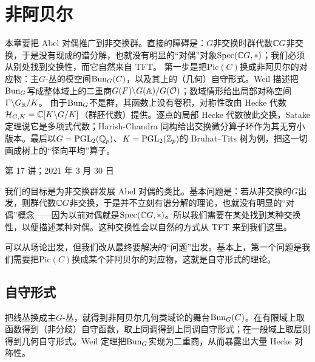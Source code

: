 \chapter{非阿贝尔}\label{ch:09}

\begin{keytakeaways}
本章要把 Abel 对偶推广到非交换群。直接的障碍是：$G$非交换时群代数$\mathbb{C} G$非交换，于是没有现成的谱分解，也就没有明显的“对偶”对象$\mathrm{Spec}(\mathbb{C} G,*)$；我们必须从别处找到交换性，而它自然来自 TFT。
第一步是把$\mathrm{Pic}(C)$换成非阿贝尔的对应物：主$G$-丛的模空间$\mathrm{Bun}_G(C)$，以及其上的（几何）自守形式。Weil 描述把$\mathrm{Bun}_G$写成整体域上的二重商$G(F)\backslash G(\mathbb{A})/G(\mathcal{O})$；数域情形给出局部对称空间$\Gamma\backslash G_{\mathbb{R}}/K$。
由于$\mathrm{Bun}_G$不是群，其函数上没有卷积，对称性改由 Hecke 代数$\mathcal{H}_{G,K}=\mathbb{C}[K\backslash G/K]$（群胚代数）提供。逐点的局部 Hecke 代数彼此交换，Satake 定理说它是多项式代数；Harish-Chandra 同构给出交换微分算子环作为其无穷小版本。最后以$G=\mathrm{PGL}_2(\mathbb{Q}_p)$、$K=\mathrm{PGL}_2(\mathbb{Z}_p)$的 Bruhat--Tits 树为例，把这一切画成树上的“径向平均”算子。
\end{keytakeaways}

\begin{flushright}\small 第 17 讲；2021 年 3 月 30 日\end{flushright}

我们的目标是为非交换群发展 Abel 对偶的类比。基本问题是：若从非交换的$G$出发，则群代数$\mathbb{C} G$非交换，于是并不立刻有谱分解的理论，也就没有明显的“对偶”概念——因为以前对偶就是$\mathrm{Spec}(\mathbb{C} G,*)$。所以我们需要在某处找到某种交换性，以便描述某种对偶。这种交换性会以自然的方式从 TFT 来到我们这里。

可以从场论出发，但我们改从最终要解决的“问题”出发。基本上，第一个问题是我们需要把$\mathrm{Pic}(C)$换成某个非阿贝尔的对应物，这就是自守形式的理论。

\section{自守形式}\label{sec:9.1}
\begin{sectionkey}
把线丛换成主$G$-丛，就得到非阿贝尔几何类域论的舞台$\mathrm{Bun}_G(C)$。在有限域上取函数得到（非分歧）自守函数，取上同调得到上同调自守形式；在一般域上取层则得到几何自守形式。Weil 定理把$\mathrm{Bun}_G$实现为二重商，从而暴露出大量 Hecke 对称性。
\end{sectionkey}

